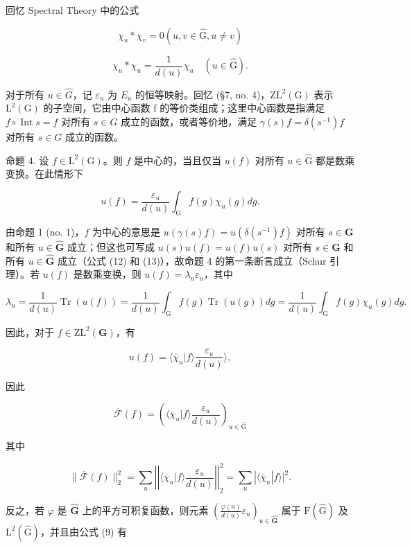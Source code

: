 回忆 Spectral Theory 中的公式

\[
\chi_ {u} * \chi_ {v} = 0 (u, v \in \hat {\mathrm{G}}, u \neq v)\tag{17}
\]

\[
\chi_ {u} * \chi_ {u} = \frac {1}{d (u)} \chi_ {u} \quad (u \in \hat {\mathrm{G}}).\tag{18}
\]

对于所有 \(u \in \hat{G}\)，记 \(\varepsilon_{u}\) 为 \(E_{u}\) 的恒等映射。回忆 (§7, no. 4)，\(\mathrm{ZL}^{2}(\mathrm{G})\) 表示 \(\mathrm{L}^{2}(\mathrm{G})\) 的子空间，它由中心函数 f 的等价类组成；这里中心函数是指满足 \(f \circ \operatorname{Int}s = f\) 对所有 \(s \in G\) 成立的函数，或者等价地，满足 \(\gamma(s)f = \delta(s^{-1})f\) 对所有 \(s \in G\) 成立的函数。

命题 4. 设 \(f \in \mathrm{L}^2(\mathrm{G})\)。则 \(f\) 是中心的，当且仅当 \(u(f)\) 对所有 \(u \in \hat{\mathrm{G}}\) 都是数乘变换。在此情形下

\[
u (f) = \frac {\varepsilon_ {u}}{d (u)} \int_ {\mathrm{G}} f (g) \chi_ {u} (g) d g.\tag{19}
\]

由命题 1 (no. 1)，\(f\) 为中心的意思是 \(u(\gamma(s)f) = u(\delta(s^{-1})f)\) 对所有 \(s \in \mathbf{G}\) 和所有 \(u \in \hat{\mathbf{G}}\) 成立；但这也可写成 \(u(s)u(f) = u(f)u(s)\) 对所有 \(s \in \mathbf{G}\) 和所有 \(u \in \hat{\mathbf{G}}\) 成立（公式 (12) 和 (13)），故命题 4 的第一条断言成立（Schur 引理）。若 \(u(f)\) 是数乘变换，则 \(u(f) = \lambda_u\varepsilon_u\)，其中

\[
\lambda_ {u} = \frac {1}{d (u)} \operatorname{Tr} (u (f)) = \frac {1}{d (u)} \int_ {\mathrm{G}} f (g) \operatorname{Tr} (u (g)) d g = \frac {1}{d (u)} \int_ {\mathrm{G}} f (g) \chi_ {u} (g) d g.
\]

因此，对于 \(f \in \mathrm{ZL}^2(\mathbf{G})\)，有

\[
u (f) = \langle \overline {{\chi}} _ {u} | f \rangle \frac {\varepsilon_ {u}}{d (u)} \rangle ,\tag{20}
\]

因此

\[
\overline {{{{\mathcal {F}}}}} (f) = \left(\langle \overline {{{{\chi}}}} _ {u} | f \rangle \frac {\varepsilon_ {u}}{d (u)}\right) _ {u \in \hat {\mathrm{G}}}\tag{21}
\]

其中

\[
\| \overline {{\mathcal {F}}} (f) \| _ {2} ^ {2} = \sum_ {u} \left| \left| \langle \overline {{\chi}} _ {u} | f \rangle \frac {\varepsilon_ {u}}{d (u)} \right| \right| _ {2} ^ {2} = \sum_ {u} | \langle \overline {{\chi}} _ {u} | f \rangle | ^ {2}.
\]

反之，若 \(\varphi\) 是 \(\hat{\mathbf{G}}\) 上的平方可积复函数，则元素 \(\left(\frac{\varphi(u)}{d(u)}\varepsilon_u\right)_{u\in \hat{\mathbf{G}}}\) 属于 \(\mathrm{F}(\hat{\mathrm{G}})\) 及 \(\mathrm{L}^2 (\hat{\mathrm{G}})\)，并且由公式 (9) 有

